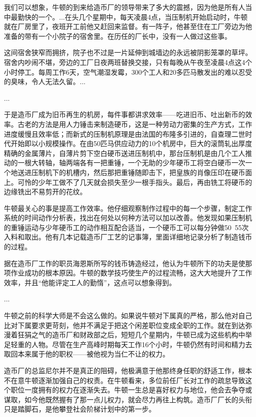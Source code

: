 \documentclass[12pt,oneside]{book}
\begin{document}
\begin{mdframed}
我们可以想象，牛顿的到来给造币厂的领导带来了多大的震撼，因为他是所有人当中最勤快的一个。...在头几个星期中，每天凌晨4点，当压制机开始启动时，牛顿就在厂房里了，夜班开工前他又赶回来监督。有一阵子，他甚至住在工厂旁边为他准备的带有一个小院子的宿舍里。在历任的厂长中，没有一人做过这些事。

这间宿舍狭窄而拥挤，院子也不过是一片延伸到城墙边的永远被阴影笼罩的草坪。宿舍内吵闹不堪，旁边的工厂日夜两班替换交接，只有每晚从午夜至凌晨4点这4个小时停工。每周工作6天，空气潮湿发霉，300个工人和20多匹马散发出的难以忍受的臭味，令人无法久留。...

...

于是造币厂成为旧币再生的机房，每件事都讲求效率——吃进旧币、吐出新币的效率。古老的方法是用人力锤击来制造硬币，这是一种劳动力密集的生产方式，工作进度缓慢且效率低；而新式的压制机原理是由法国的布隆多引进的，自查理二世时代开始即以小规模操作。在由50匹马供应动力的10个机房中，巨大的滚筒轧出厚度精确的金属薄片，自薄片剪下空白硬币送进压制机中，那台压制机是由几个工人推动的一根大转轴，轴两端各有一把重锤，一个无助的少年硬币工将空白硬币一次一个地送进压制机下的机槽内，然后那把重锤随即击下，把皇族的肖像压印在硬币面上。可怜的少年工做不了几天就会损失至少一根手指头。最后，再由铣工将硬币的边缘铣出不易剪开的花纹。

牛顿最关心的事是提高工作效率。他仔细观察制作过程中的每一个步骤，制定工作系统的时间动作分析表，找出在何处以何种方法可以加以改善。他发现如果压制机的重锤运动与少年硬币工的动作相互配合适当，一个硬币工可以每分钟做50~55次入料和取出。他有几本记载造币厂工艺的记事簿，里面详细地记录分析了制造钱币的过程。

据在造币厂工作的职员海恩斯所写的钱币铸造经过，他认为牛顿所下的功夫是使那项作业成功的根本原因。牛顿的数学技巧使生产的过程流畅，这大大地提升了工作效率，并且“他能评定工人的勤惰”，这点可以想象得到。

...

牛顿之前的科学大师是不会这么做的。如果说牛顿对下属真的严格，那么他对自己比对下属要求更苛刻，他并不满足于把这个闲差职位变成全职的工作。就在到达弥漫着狂狷之气的造币厂和财政部之后，短短几个星期内，牛顿已成为这些机构中举足轻重的人物。尽管在生产高峰时期每天工作16个小时，牛顿仍然有时间和精力去取回本来属于他的职权——被他视为当仁不让的权力。

造币厂的总监尼尔并不是真正的阻碍，他极满意于他那终身任职的舒适工作，根本不在意牛顿逐渐加强自己的权责。在牛顿看来，多位前任厂长对工作的疏怠导致这个职位一度拥有的权力在逐渐失去。牛顿一生总是喜好权力与地位，他会去争夺或谋取，如今他既然握有了那一点儿权力，就会尽力再往上构筑。造币厂厂长的头衔只是踏脚石，是他攀登社会阶梯计划中的第一步。


\end{mdframed}
\end{document}
